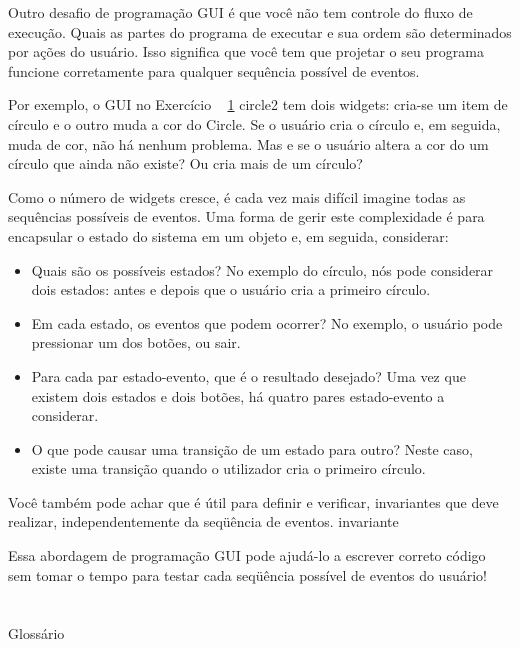 \documentclass[10pt]{book}
\begin{document}
\begin{v erbatim}
Outro desafio de programação GUI é que você não tem controle
do fluxo de execução. Quais as partes do programa de executar
e sua ordem são determinados por ações do usuário.
Isso significa que você tem que projetar o seu programa funcione corretamente
para qualquer sequência possível de eventos.

Por exemplo, o GUI no Exercício ~ \ref {} circle2 tem dois widgets:
cria-se um item de círculo e o outro muda a cor do
Circle. Se o usuário cria o círculo e, em seguida, muda de cor,
não há nenhum problema. Mas e se o usuário altera a cor do
um círculo que ainda não existe? Ou cria mais de um círculo?

Como o número de widgets cresce, é cada vez mais difícil
imagine todas as sequências possíveis de eventos. Uma forma de gerir este
complexidade é para encapsular o estado do sistema em um objeto
e, em seguida, considerar:

\begin{itemize}

\item Quais são os possíveis estados? No exemplo do círculo, nós
pode considerar dois estados: antes e depois que o usuário cria a
primeiro círculo.

\item Em cada estado, os eventos que podem ocorrer? No exemplo,
o usuário pode pressionar um dos botões, ou sair.

\item Para cada par estado-evento, que é o resultado desejado?
Uma vez que existem dois estados e dois botões, há quatro
pares estado-evento a considerar.

\item O que pode causar uma transição de um estado para outro?
Neste caso, existe uma transição quando o utilizador cria
o primeiro círculo.

\end{itemize}

Você também pode achar que é útil para definir e verificar, invariantes que
deve realizar, independentemente da seqüência de eventos.
\index{} invariante

Essa abordagem de programação GUI pode ajudá-lo a escrever correto
código sem tomar o tempo para testar cada seqüência possível
de eventos do usuário!


\section{} Glossário


\end{v erbatim}
\end{document}
